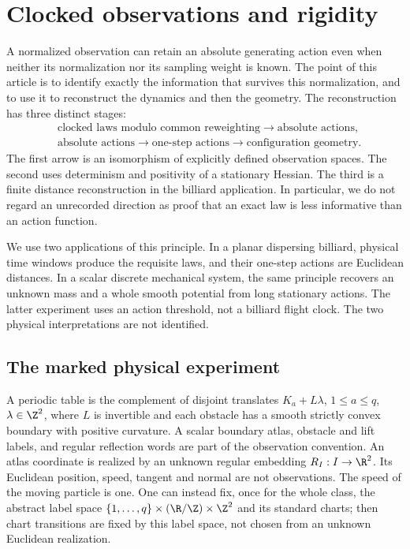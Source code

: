 \section{Clocked observations and rigidity}
\label{sec:v78-introduction}

A normalized observation can retain an absolute generating action even
when neither its normalization nor its sampling weight is known.  The
point of this article is to identify exactly the information that survives
this normalization, and to use it to reconstruct the dynamics and then
the geometry.  The reconstruction has three distinct stages:
\[
\begin{aligned}
 &\text{clocked laws modulo common reweighting}
       \longrightarrow \text{absolute actions},\\
 &\text{absolute actions}\longrightarrow\text{one-step actions}
       \longrightarrow\text{configuration geometry}.
\end{aligned}
\]
The first arrow is an isomorphism of explicitly defined observation
spaces.  The second uses determinism and positivity of a stationary
Hessian.  The third is a finite distance reconstruction in the billiard
application.  In particular, we do not regard an unrecorded direction as
proof that an exact law is less informative than an action function.

We use two applications of this principle.  In a planar dispersing
billiard, physical time windows produce the requisite laws, and their
one-step actions are Euclidean distances.  In a scalar discrete mechanical
system, the same principle recovers an unknown mass and a whole smooth
potential from long stationary actions.  The latter experiment uses an
action threshold, not a billiard flight clock.  The two physical
interpretations are not identified.

\subsection{The marked physical experiment}
A periodic table is the complement of disjoint translates
$K_a+L\lambda$, $1\le a\le q$, $\lambda\in\Z^2$, where $L$ is
invertible and each obstacle has a smooth strictly convex boundary with
positive curvature.  A scalar boundary atlas, obstacle and lift labels,
and regular reflection words are part of the observation convention.
An atlas coordinate is realized by an unknown regular embedding
$R_I:I\to\R^2$.  Its Euclidean position, speed, tangent and normal are
not observations.  The speed of the moving particle is one.  One can
instead fix, once for the whole class, the abstract label space
$\{1,\ldots,q\}\times(\R/\Z)\times\Z^2$ and its standard charts;
then chart transitions are fixed by this label space, not chosen from
an unknown Euclidean realization.

